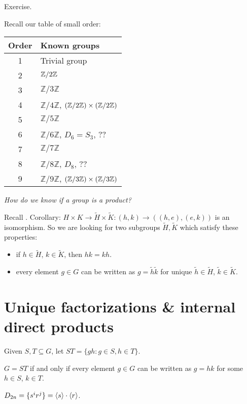 \begin{pf}
Exercise.
\end{pf}

Recall our table of small order:
\begin{center}
	\begin{tabular}{c | l}
		Order & Known groups \\\hline 
		1 & Trivial group \\
		2 & $\mathbb Z/{2}\mathbb Z$\\
	3 & $\mathbb Z/ 3 \mathbb Z$\\
	4 & $\mathbb Z/ 4 \mathbb Z$, $(\mathbb Z/{2}\mathbb Z)\times (\mathbb Z/{2}\mathbb Z)$\\
	5 & $\mathbb Z/ 5 \mathbb Z$\\
	6 & $\mathbb Z/ 6 \mathbb Z$, $D_6=S_3$, ??\\
	7 & $\mathbb Z/ 7 \mathbb Z$\\
	8 & $\mathbb Z/ 8 \mathbb Z$, $D_8$, ?? \\
	9 & $\mathbb Z/ 9 \mathbb Z$, $(\mathbb Z/{3}\mathbb Z)\times (\mathbb Z/{3}\mathbb Z)$\\
	\end{tabular}
\end{center}	

\textit{How do we know if a group is a product?}

Recall . Corollary: $H\times K\to \tilde{H}\times \tilde{K}: (h,k)\to ((h,e),(e,k))$ is an isomorphism. So we are looking for two subgroups $\tilde{H}, \tilde{K}$ which satisfy these properties:
\begin{itemize}
	\item if $h\in \tilde{H}$, $k\in\tilde{K}$, then $hk=kh$.
	\item every element $g\in G$ can be written as $g=\tilde{h}\tilde{k}$ for unique $\tilde{h}\in \tilde{H}$, $\tilde{k}\in \tilde{K}$.
\end{itemize} 

\section{Unique factorizations \& internal direct products }
Given $S,T\subseteq G$, let $ST=\{gh:g\in S,h\in T\}$.

\begin{lemma}
$G=ST$ if and only if every element $g\in G$ can be written as $g=hk$ for some $h\in S$, $k\in T$.
\end{lemma}

\begin{ex}
$D_{2n}=\{s^ir^j\} = \left\langle s \right\rangle\cdot \left\langle r \right\rangle$.
\end{ex}


